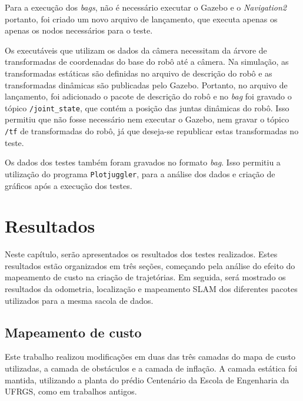 \documentclass[repeatfields,xlists,xpacks,oneside,yearsonly]{ufrgscca}
\begin{document}


Para a execução dos \textit{bags}, não é necessário executar o Gazebo
e o \textit{Navigation2} portanto, foi criado um novo arquivo de
lançamento, que executa apenas os apenas os nodos necessários para o
teste.

Os executáveis que utilizam os dados da câmera necessitam da árvore
de transformadas de coordenadas do base do robô até a câmera. Na
simulação, as transformadas estáticas são definidas no arquivo de
descrição do robô e as transformadas dinâmicas são publicadas pelo
Gazebo. Portanto, no arquivo de lançamento, foi adicionado o pacote
de descrição do robô e no \textit{bag} foi gravado o tópico
\texttt{/joint\_state}, que contém a posição das juntas dinâmicas do
robô. Isso permitiu que não fosse necessário nem executar o Gazebo,
nem gravar o tópico \texttt{/tf} de transformadas do robô, já que
deseja-se republicar estas transformadas no teste.

Os dados dos testes também foram gravados no formato \textit{bag}.
Isso permitiu a utilização do programa  \texttt{Plotjuggler}, para a análise dos dados e criação
de gráficos após a execução dos testes.

\chapter{Resultados}
\label{resultados}

Neste capítulo, serão apresentados os resultados dos testes
realizados. Estes resultados estão organizados em três seções,
começando pela análise do efeito do mapeamento de custo na criação de
trajetórias. Em seguida, será mostrado os resultados da odometria,
localização e mapeamento SLAM dos diferentes pacotes utilizados para
a mesma sacola de dados.

\section{Mapeamento de custo}

Este trabalho realizou modificações em duas das três camadas do mapa
de custo utilizadas, a camada de obstáculos e a camada de inflação. A
camada estática foi mantida, utilizando a planta do prédio Centenário
da Escola de Engenharia da UFRGS, como em trabalhos antigos.
\end{document}
